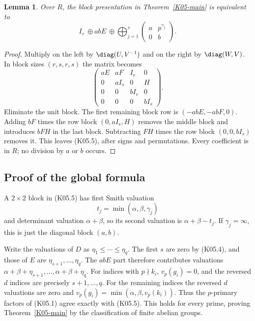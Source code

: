 \documentclass[11pt,a4paper]{article}
\newtheorem{lemma}[theorem]{Lemma}
\theoremstyle{definition}\newtheorem{definition}[theorem]{Definition}
\theoremstyle{remark}\newtheorem{remark}[theorem]{Remark}
\numberwithin{equation}{section}
\begin{document}
\begin{lemma}\label{K05-local}
Over $R$, the block presentation in Theorem~\ref{K05-main} is equivalent to
\[
 I_r\ \oplus abE\ \oplus\bigoplus_{j=1}^s
       \begin{pmatrix}a&p^{\gamma_j}\\0&b\end{pmatrix}.       \tag{K05.5}
\]
\end{lemma}
\begin{proof}
Multiply on the left by $\diag(U,V^{-1})$ and on the right by $\diag(W,V)$. In block sizes $(r,s,r,s)$ the matrix becomes
\[
 \begin{pmatrix}
 aE&aF&I_r&0\\
 0&aI_s&0&H\\
 0&0&bI_r&0\\
 0&0&0&bI_s
 \end{pmatrix}.                                               \tag{K05.6}
\]
Eliminate the unit block. The first remaining block row is $(-abE,-abF,0)$. Adding $bF$ times the row block $(0,aI_s,H)$ removes the middle block and introduces $bFH$ in the last block. Subtracting $FH$ times the row block $(0,0,bI_s)$ removes it. This leaves (K05.5), after signs and permutations. Every coefficient is in $R$; no division by $a$ or $b$ occurs.
\end{proof}

\subsection{Proof of the global formula}\label{K05-sec-3}
A $2\times2$ block in (K05.5) has first Smith valuation
\[
 t_j=\min(\alpha,\beta,\gamma_j)
\]
and determinant valuation $\alpha+\beta$, so its second valuation is $\alpha+\beta-t_j$. If $\gamma_j=\infty$, this is just the diagonal block $(a,b)$.

Write the valuations of $D$ as $\eta_1\leq\cdots\leq\eta_q$. The first $s$ are zero by (K05.4), and those of $E$ are $\eta_{s+1},\ldots,\eta_q$. The $abE$ part therefore contributes valuations $\alpha+\beta+\eta_{s+1},\ldots,\alpha+\beta+\eta_q$. For indices with $p\nmid k_i$, $v_p(g_i)=0$, and the reversed $d$ indices are precisely $s+1,\ldots,q$. For the remaining indices the reversed $d$ valuations are zero and $v_p(g_i)=\min(\alpha,\beta,v_p(k_i))$. Thus the $p$-primary factors of (K05.1) agree exactly with (K05.5). This holds for every prime, proving Theorem~\ref{K05-main} by the classification of finite abelian groups.
\end{document}
